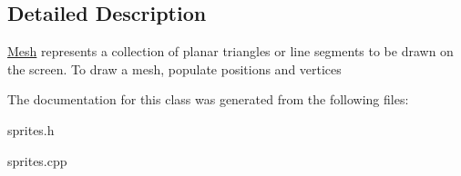 \subsection{Detailed Description}
\hyperlink{classg2c_1_1_mesh}{Mesh} represents a collection of planar triangles or line segments to be drawn on the screen. To draw a mesh, populate positions and vertices 

The documentation for this class was generated from the following files:\begin{DoxyCompactItemize}
\item 
sprites.h\item 
sprites.cpp\end{DoxyCompactItemize}
